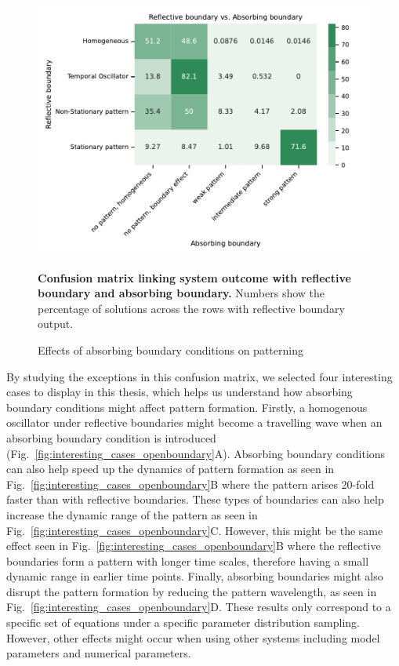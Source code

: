 \begin{figure}[H] %
    \centering
    \begin{adjustbox}{center}
        \includegraphics[width=1\textwidth]{chapters/Chapter 1/nogrowth_openboundary_confusion_variant0-11-12} %
    \end{adjustbox}
    \caption{\textbf{Confusion matrix linking system outcome with reflective boundary and absorbing boundary.} Numbers show the percentage of solutions across the rows with reflective boundary output.}
    \caption{Effects of absorbing boundary conditions on patterning}
    \label{fig:nogrowth_openboundary_confusion_variant0} %
\end{figure}

By studying the exceptions in this confusion matrix, we selected four interesting cases to display in this thesis, which helps us understand how absorbing boundary conditions might affect pattern formation.
Firstly, a homogenous oscillator under reflective boundaries might become a travelling wave when an absorbing boundary condition is introduced (Fig.~\ref{fig:interesting_cases_openboundary}A).
Absorbing boundary conditions can also help speed up the dynamics of pattern formation as seen in Fig.~\ref{fig:interesting_cases_openboundary}B where the pattern arises 20-fold faster than with reflective boundaries.
These types of boundaries can also help increase the dynamic range of the pattern as seen in Fig.~\ref{fig:interesting_cases_openboundary}C.
However, this might be the same effect seen in Fig.~\ref{fig:interesting_cases_openboundary}B where the reflective boundaries form a pattern with longer time scales, therefore having a small dynamic range in earlier time points.
Finally, absorbing boundaries might also disrupt the pattern formation by reducing the pattern wavelength, as seen in Fig.~\ref{fig:interesting_cases_openboundary}D.
These results only correspond to a specific set of equations under a specific parameter distribution sampling.
However, other effects might occur when using other systems including model parameters and numerical parameters.

